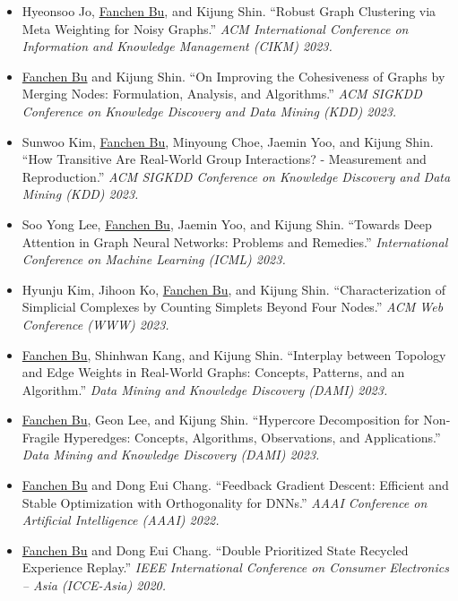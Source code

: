 \documentclass{resume}
\begin{document}
\begin{itemize}[parsep=0.5ex]
  \item [{[C7]}]
  Hyeonsoo Jo, \underline{Fanchen Bu}, and Kijung Shin.
  ``Robust Graph Clustering via Meta Weighting for Noisy Graphs.''
  \textit{ACM International Conference on Information and Knowledge Management (CIKM) 2023.}
  
  \item [{[C6]}]
  \underline{Fanchen Bu} and Kijung Shin.
  ``On Improving the Cohesiveness of Graphs by Merging Nodes: Formulation, Analysis, and Algorithms.''
  \textit{ACM SIGKDD Conference on Knowledge Discovery and Data Mining (KDD) 2023.}
  
  \item [{[C5]}]
  Sunwoo Kim, \underline{Fanchen Bu}, Minyoung Choe, Jaemin Yoo, and Kijung Shin.
  ``How Transitive Are Real-World Group Interactions? - Measurement and Reproduction.''
  \textit{ACM SIGKDD Conference on Knowledge Discovery and Data Mining (KDD) 2023.}

  \item [{[C4]}]
  Soo Yong Lee, \underline{Fanchen Bu}, Jaemin Yoo, and Kijung Shin.
  ``Towards Deep Attention in Graph Neural Networks: Problems and Remedies.''
  \textit{International Conference on Machine Learning (ICML) 2023.}
  
  \item [{[C3]}]
  Hyunju Kim, Jihoon Ko, \underline{Fanchen Bu}, and Kijung Shin.
  ``Characterization of Simplicial Complexes by Counting Simplets Beyond Four Nodes.''
  \textit{ACM Web Conference (WWW) 2023.}
  
  \item [{[J2]}]
  \underline{Fanchen Bu}, Shinhwan Kang, and Kijung Shin.
  ``Interplay between Topology and Edge Weights in Real-World Graphs: Concepts, Patterns, and an Algorithm.''
  \textit{Data Mining and Knowledge Discovery (DAMI) 2023.}
  
  \item [{[J1]}]
  \underline{Fanchen Bu}, Geon Lee, and Kijung Shin.
  ``Hypercore Decomposition for Non-Fragile Hyperedges: Concepts, Algorithms, Observations, and Applications.''
  \textit{Data Mining and Knowledge Discovery (DAMI) 2023.}    

  \item [{[C2]}]
  \underline{Fanchen Bu} and Dong Eui Chang.
  ``Feedback Gradient Descent: Efficient and Stable Optimization with Orthogonality for DNNs.''
  \textit{AAAI Conference on Artificial Intelligence (AAAI) 2022.}

  \item [{[C1]}]
  \underline{Fanchen Bu} and Dong Eui Chang.
  ``Double Prioritized State Recycled Experience Replay.''
  \textit{IEEE International Conference on Consumer Electronics -- Asia (ICCE-Asia) 2020.} 
\end{itemize}
\end{document}
